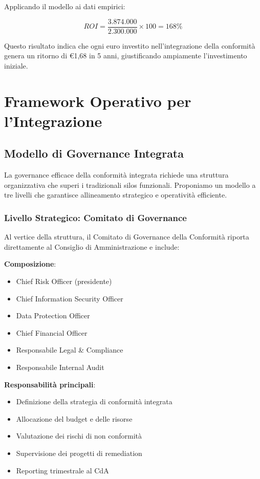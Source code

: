 Applicando il modello ai dati empirici:

\begin{equation}
ROI = \frac{3.874.000}{2.300.000} \times 100 = 168\%
\end{equation}

Questo risultato indica che ogni euro investito nell'integrazione della conformità genera un ritorno di €1,68 in 5 anni, giustificando ampiamente l'investimento iniziale.

\section{Framework Operativo per l'Integrazione}
\label{sec:4.6_framework}

\subsection{Modello di Governance Integrata}
\label{subsec:4.6.1_governance}

La governance efficace della conformità integrata richiede una struttura organizzativa che superi i tradizionali silos funzionali. Proponiamo un modello a tre livelli che garantisce allineamento strategico e operatività efficiente.

\subsubsection{Livello Strategico: Comitato di Governance}

Al vertice della struttura, il Comitato di Governance della Conformità riporta direttamente al Consiglio di Amministrazione e include:

\textbf{Composizione}:
\begin{itemize}
    \item Chief Risk Officer (presidente)
    \item Chief Information Security Officer
    \item Data Protection Officer
    \item Chief Financial Officer
    \item Responsabile Legal \& Compliance
    \item Responsabile Internal Audit
\end{itemize}

\textbf{Responsabilità principali}:
\begin{itemize}
    \item Definizione della strategia di conformità integrata
    \item Allocazione del budget e delle risorse
    \item Valutazione dei rischi di non conformità
    \item Supervisione dei progetti di remediation
    \item Reporting trimestrale al CdA
\end{itemize}

